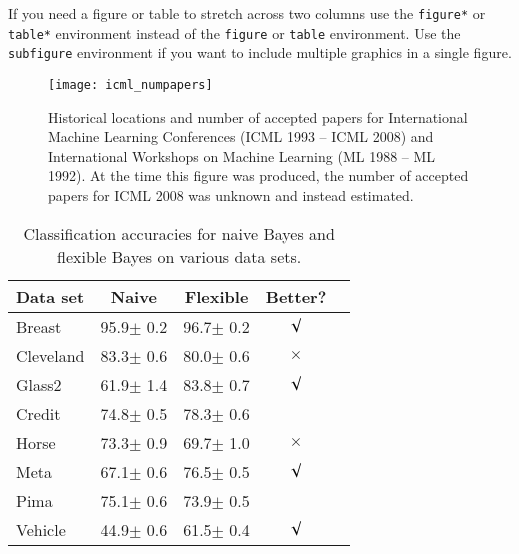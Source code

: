 \documentclass{article}
\begin{document}
If you need a figure or table to stretch across two columns use the \verb+figure*+ or \verb+table*+ environment instead of the \verb+figure+ or \verb+table+ environment.  Use the \verb+subfigure+ environment if you want to include multiple graphics in a single figure.

\begin{figure}[tb]
\vskip 5mm
\begin{center}
\centerline{\texttt{[image: icml\_numpapers]}}
\caption{Historical locations and number of accepted papers for International
  Machine Learning Conferences (ICML 1993 -- ICML 2008) and
  International Workshops on Machine Learning (ML 1988 -- ML
  1992). At the time this figure was produced, the number of
  accepted papers for ICML 2008 was unknown and instead estimated.}
\label{fig:sample-graph}
\end{center}
\vskip -5mm
\end{figure} 

\begin{table}[tb]
\vskip 3mm
\begin{center}
\begin{small}
\begin{sc}
\begin{tabular}{lcccr}
\hline
\abovespace\belowspace
Data set & Naive & Flexible & Better? \\
\hline
\abovespace
Breast    & 95.9$\pm$ 0.2& 96.7$\pm$ 0.2& $\surd$ \\
Cleveland & 83.3$\pm$ 0.6& 80.0$\pm$ 0.6& $\times$\\
Glass2    & 61.9$\pm$ 1.4& 83.8$\pm$ 0.7& $\surd$ \\
Credit    & 74.8$\pm$ 0.5& 78.3$\pm$ 0.6&         \\
Horse     & 73.3$\pm$ 0.9& 69.7$\pm$ 1.0& $\times$\\
Meta      & 67.1$\pm$ 0.6& 76.5$\pm$ 0.5& $\surd$ \\
Pima      & 75.1$\pm$ 0.6& 73.9$\pm$ 0.5&         \\
\belowspace
Vehicle   & 44.9$\pm$ 0.6& 61.5$\pm$ 0.4& $\surd$ \\
\hline
\end{tabular}
\end{sc}
\end{small}
\caption{Classification accuracies for naive Bayes and flexible 
Bayes on various data sets.}
\label{tab:sample-table}
\end{center}
\vskip -3mm
\end{table}
\end{document}
